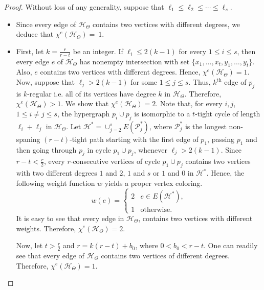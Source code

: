 \documentclass[12pt,a4paper]{article}
\begin{document}
\begin{proof}  Without loss of any generality, suppose that $\ell_1 \leq \ell_2 \leq \cdots \leq \ell_s$.\\
	\begin{itemize}
		\item[i.] Since every edge of $\mathcal{H}_{\Theta}$ contains two vertices with  different degrees, we deduce that $ \chi^{e}(\mathcal{H}_{\Theta})=~1$.
		
		\item[ii.] First, let $k=\frac{r}{r-t}$ be an integer. If $\ell _i \leq 2(k-1)$ for every $1\leq i \leq s$, then  every edge $e$ of $\mathcal{H}_{\Theta}$ has nonempty intersection with  set $\{x_1,\ldots, x_{t}, y_1,\ldots, y_{t}\}$. Also, $e$ contains two vertices with different degrees. Hence, $ \chi^{e}(\mathcal{H}_{\Theta})=1$.
		Now, suppose that  $\ell _j > 2(k-1)$ for some $1\leq j \leq s$. Thus, $k^{\text{th}}$ edge of $p_j$ is $k$-regular i.e. all of its vertices have degree $k$ in $\mathcal{H}_{\Theta}$. Therefore, $ \chi^{e}(\mathcal{H}_{\Theta})>1$. We show that $ \chi^{e}(\mathcal{H}_{\Theta})=2$.
		Note that, for every $i,j$,  $1\leq i\neq j\leq s$, the hypergraph $p_i \cup p_j$ is isomorphic to a $t$-tight cycle of length $\ell_i + \ell_j$ in $\mathcal{H}_{\Theta}$.
		Let  $\mathcal{H}^*=\cup_{j=2}^{s} E(\mathcal{P}^*_j)$, where $\mathcal{P}^*_j$ is the longest non-spaning $(r-t)$-tight path starting with the first edge of $p_1$, passing $p_1$ and then going through $p_j$ in cycle $p_1 \cup p_j$, whenever $\ell_j > 2(k-1)$.
		Since
		$ r-t<\frac{r}{2} $, every $r$-consecutive vertices of  cycle $ p_1 \cup p_j$ contains   two vertices with two different degrees $1$ and $2$, $1$ and $s$ or $1$ and $0$ in $\mathcal{H}^*$. Hence, the following weight function $ w $ yields a proper vertex coloring.
		\begin{equation*}
		w(e)=
		\left\{
		\begin{array}{cl}
		2 &e \in  E(\mathcal{H}^*), \\
		1 & \text{otherwise.}
		\end{array}
		\right.
		\end{equation*}
		It is easy to see that every edge in $\mathcal{H}_{\Theta}$, contains two vertices with different weights.
		Therefore,
		$\chi^e(\mathcal{H}_{\Theta})=2  $.
		
		Now, let $t>\frac{r}{2}$ and $r=k(r-t)+b_0$, where $0< b_0 <r-t$. One can readily see that every edge of $\mathcal{H}_{\Theta}$  contains two vertices of  different degrees. Therefore, $ \chi^{e}(\mathcal{H}_{\Theta})=1$.
				

\end{itemize}
\end{proof}
\end{document}
